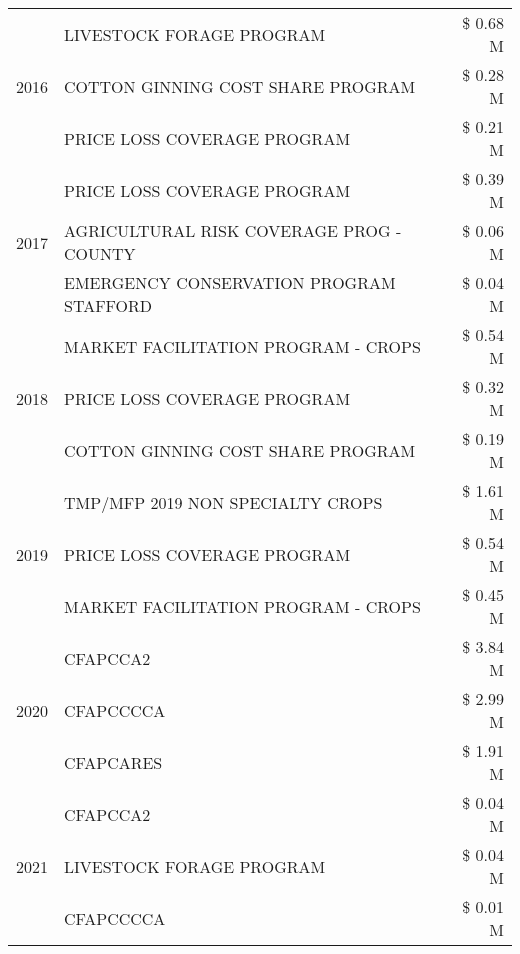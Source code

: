 \begin{tabular}{llr}
\multirow[t]{3}{*}{2016} & LIVESTOCK FORAGE PROGRAM & \$ 0.68 M \\
 & COTTON GINNING COST SHARE PROGRAM & \$ 0.28 M \\
 & PRICE LOSS COVERAGE PROGRAM & \$ 0.21 M \\
\cline{1-3}
\multirow[t]{3}{*}{2017} & PRICE LOSS COVERAGE PROGRAM & \$ 0.39 M \\
 & AGRICULTURAL RISK COVERAGE PROG - COUNTY & \$ 0.06 M \\
 & EMERGENCY CONSERVATION PROGRAM STAFFORD & \$ 0.04 M \\
\cline{1-3}
\multirow[t]{3}{*}{2018} & MARKET FACILITATION PROGRAM - CROPS & \$ 0.54 M \\
 & PRICE LOSS COVERAGE PROGRAM & \$ 0.32 M \\
 & COTTON GINNING COST SHARE PROGRAM & \$ 0.19 M \\
\cline{1-3}
\multirow[t]{3}{*}{2019} & TMP/MFP 2019 NON SPECIALTY CROPS & \$ 1.61 M \\
 & PRICE LOSS COVERAGE PROGRAM & \$ 0.54 M \\
 & MARKET FACILITATION PROGRAM - CROPS & \$ 0.45 M \\
\cline{1-3}
\multirow[t]{3}{*}{2020} & CFAPCCA2 & \$ 3.84 M \\
 & CFAPCCCCA & \$ 2.99 M \\
 & CFAPCARES & \$ 1.91 M \\
\cline{1-3}
\multirow[t]{3}{*}{2021} & CFAPCCA2 & \$ 0.04 M \\
 & LIVESTOCK FORAGE PROGRAM & \$ 0.04 M \\
 & CFAPCCCCA & \$ 0.01 M \\
\cline{1-3}
\bottomrule
\end{tabular}
